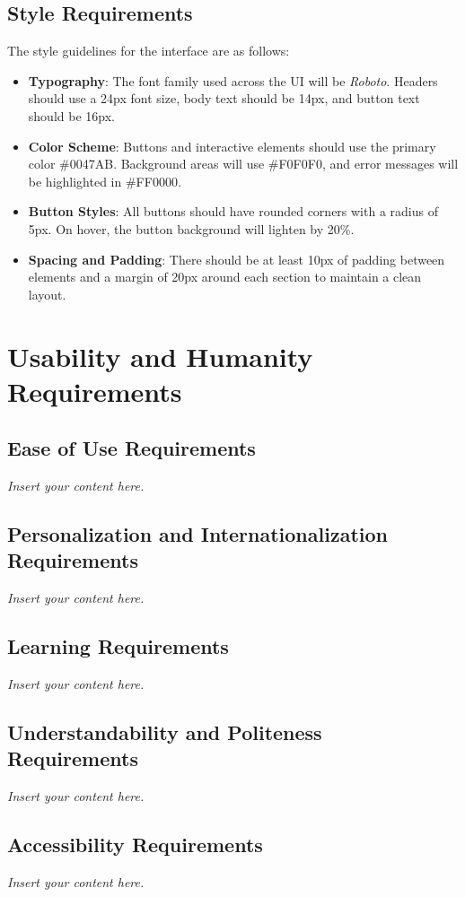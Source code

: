 \documentclass[12pt]{article}
\newcommand{\lips}{\textit{Insert your content here.}}
\begin{document}
\subsection{Style Requirements}
The style guidelines for the interface are as follows:
\begin{itemize}
    \item \textbf{Typography}: The font family used across the UI will be 
    \textit{Roboto}. Headers should use a 24px font size, body text should be 
    14px, and button text should be 16px.
    
    \item \textbf{Color Scheme}: Buttons and interactive elements should use the 
    primary color \#0047AB. Background areas will use \#F0F0F0, and error 
    messages will be highlighted in \#FF0000.
    
    \item \textbf{Button Styles}: All buttons should have rounded corners with 
    a radius of 5px. On hover, the button background will lighten by 20\%.
    
    \item \textbf{Spacing and Padding}: There should be at least 10px of padding 
    between elements and a margin of 20px around each section to maintain a clean 
    layout.
\end{itemize}


\section{Usability and Humanity Requirements}
\subsection{Ease of Use Requirements}
\lips
\subsection{Personalization and Internationalization Requirements}
\lips
\subsection{Learning Requirements}
\lips
\subsection{Understandability and Politeness Requirements}
\lips
\subsection{Accessibility Requirements}
\lips
\end{document}
